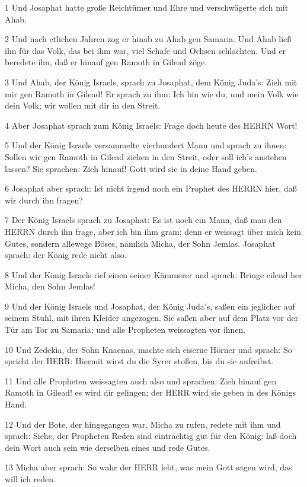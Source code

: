 \par 1 Und Josaphat hatte große Reichtümer und Ehre und verschwägerte sich mit Ahab.
\par 2 Und nach etlichen Jahren zog er hinab zu Ahab gen Samaria. Und Ahab ließ ihn für das Volk, das bei ihm war, viel Schafe und Ochsen schlachten. Und er beredete ihn, daß er hinauf gen Ramoth in Gilead zöge.
\par 3 Und Ahab, der König Israels, sprach zu Josaphat, dem König Juda's: Zieh mit mir gen Ramoth in Gilead! Er sprach zu ihm: Ich bin wie du, und mein Volk wie dein Volk; wir wollen mit dir in den Streit.
\par 4 Aber Josaphat sprach zum König Israels: Frage doch heute des HERRN Wort!
\par 5 Und der König Israels versammelte vierhundert Mann und sprach zu ihnen: Sollen wir gen Ramoth in Gilead ziehen in den Streit, oder soll ich's anstehen lassen? Sie sprachen: Zieh hinauf! Gott wird sie in deine Hand geben.
\par 6 Josaphat aber sprach: Ist nicht irgend noch ein Prophet des HERRN hier, daß wir durch ihn fragen?
\par 7 Der König Israels sprach zu Josaphat: Es ist noch ein Mann, daß man den HERRN durch ihn frage, aber ich bin ihm gram; denn er weissagt über mich kein Gutes, sondern allewege Böses, nämlich Micha, der Sohn Jemlas. Josaphat sprach: der König rede nicht also.
\par 8 Und der König Israels rief einen seiner Kämmerer und sprach: Bringe eilend her Micha, den Sohn Jemlas!
\par 9 Und der König Israels und Josaphat, der König Juda's, saßen ein jeglicher auf seinem Stuhl, mit ihren Kleider angezogen. Sie saßen aber auf dem Platz vor der Tür am Tor zu Samaria; und alle Propheten weissagten vor ihnen.
\par 10 Und Zedekia, der Sohn Knaenas, machte sich eiserne Hörner und sprach: So spricht der HERR: Hiermit wirst du die Syrer stoßen, bis du sie aufreibst.
\par 11 Und alle Propheten weissagten auch also und sprachen: Zieh hinauf gen Ramoth in Gilead! es wird dir gelingen; der HERR wird sie geben in des Königs Hand.
\par 12 Und der Bote, der hingegangen war, Micha zu rufen, redete mit ihm und sprach: Siehe, der Propheten Reden sind einträchtig gut für den König; laß doch dein Wort auch sein wie derselben eines und rede Gutes.
\par 13 Micha aber sprach: So wahr der HERR lebt, was mein Gott sagen wird, das will ich reden.

